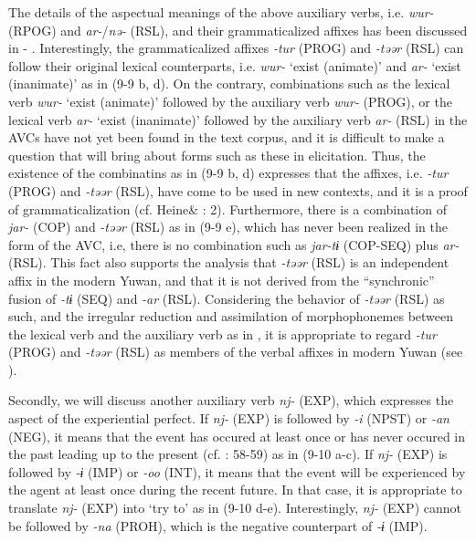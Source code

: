 The details of the aspectual meanings of the above auxiliary verbs, i.e. \textit{wur-} (RPOG) and \textit{ar-}/\textit{nə-} (RSL), and their grammaticalized affixes has been discussed in  - . Interestingly, the grammaticalized affixes \textit{{}-tur} (PROG) and \textit{{}-təər} (RSL) can follow their original lexical counterparts, i.e. \textit{wur-} ‘exist (animate)’ and \textit{ar-} ‘exist (inanimate)’ as in (9-9 b, d). On the contrary, combinations such as the lexical verb \textit{wur-} ‘exist (animate)’ followed by the auxiliary verb \textit{wur-} (PROG), or the lexical verb \textit{ar-} ‘exist (inanimate)’ followed by the auxiliary verb \textit{ar-} (RSL) in the AVCs have not yet been found in the text corpus, and it is difficult to make a question that will bring about forms such as these in elicitation. Thus, the existence of the combinatins as in (9-9 b, d) expresses that the affixes, i.e. \textit{{}-tur} (PROG) and \textit{{}-təər} (RSL), have come to be used in new contexts, and it is a proof of grammaticalization (cf. Heine\& \citealt{Kuteva2002}: 2). Furthermore, there is a combination of \textit{jar-} (COP) and \textit{{}-təər} (RSL) as in (9-9 e), which has never been realized in the form of the AVC, i.e, there is no combination such as \textit{jar-tɨ} (COP-SEQ) plus \textit{ar-} (RSL). This fact also supports the analysis that \textit{{}-təər} (RSL) is an independent affix in the modern Yuwan, and that it is not derived from the “synchronic” fusion of \textit{{}-tɨ} (SEQ) and \textit{{}-ar} (RSL). Considering the behavior of \textit{{}-təər} (RSL) as such, and the irregular reduction and assimilation of morphophonemes between the lexical verb and the auxiliary verb as in , it is appropriate to regard \textit{{}-tur} (PROG) and \textit{{}-təər} (RSL) as members of the verbal affixes in modern Yuwan (see ).

Secondly, we will discuss another auxiliary verb \textit{nj-} (EXP), which expresses the aspect of the experiential perfect. If \textit{nj-} (EXP) is followed by \textit{{}-i} (NPST) or \textit{{}-an} (NEG), it means that the event has occured at least once or has never occured in the past leading up to the present (cf. \citealt{Comrie1976}: 58-59) as in (9-10 a-c). If \textit{nj-} (EXP) is followed by \textit{{}-ɨ} (IMP) or \textit{{}-oo} (INT), it means that the event will be experienced by the agent at least once during the recent future. In that case, it is appropriate to translate \textit{nj-} (EXP) into ‘try to’ as in (9-10 d-e). Interestingly, \textit{nj-} (EXP) cannot be followed by \textit{{}-na} (PROH), which is the negative counterpart of \textit{{}-ɨ} (IMP).

